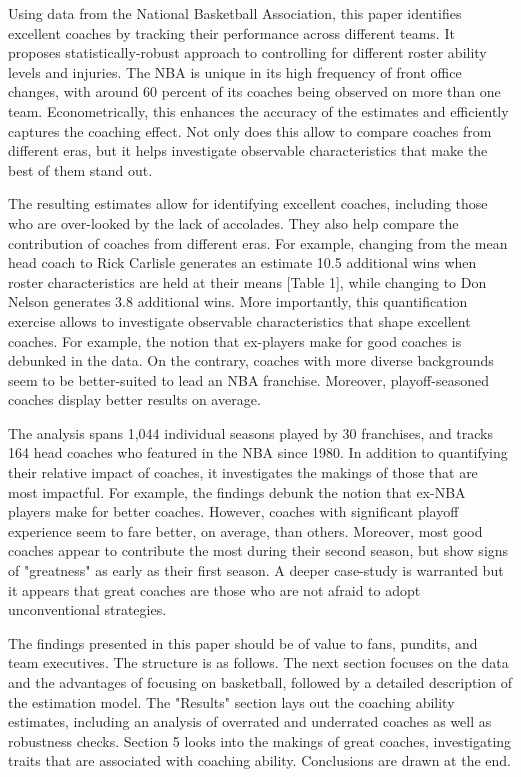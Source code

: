 \documentclass[main.tex]{subfiles}
\begin{document}
Using data from the National Basketball Association, this paper identifies excellent coaches by tracking their performance across different teams. It proposes statistically-robust approach to controlling for different roster ability levels and injuries. The NBA is unique in its high frequency of front office changes, with around 60 percent of its coaches being observed on more than one team. Econometrically, this enhances the accuracy of the estimates and efficiently captures the coaching effect.
Not only does this allow to compare coaches from different eras, but it helps investigate observable characteristics that make the best of them stand out. 

The resulting estimates allow for identifying excellent coaches, including those who are over-looked by the lack of accolades. They also help compare the contribution of coaches from different eras. For example, changing from the mean head coach to Rick Carlisle generates an estimate 10.5 additional wins when roster characteristics are held at their means [Table 1], while changing to Don Nelson generates 3.8 additional wins. More importantly, this quantification exercise allows to investigate observable characteristics that shape excellent coaches. For example, the notion that ex-players make for good coaches is debunked in the data. On the contrary, coaches with more diverse backgrounds seem to be better-suited to lead an NBA franchise. Moreover, playoff-seasoned coaches display better results on average.

The analysis spans 1,044 individual seasons played by 30 franchises, and tracks 164 head coaches who featured in the NBA since 1980. In addition to quantifying their relative impact of coaches, it investigates the makings of those that are most impactful. For example, the findings debunk the notion that ex-NBA players make for better coaches. However, coaches with significant playoff experience seem to fare better, on average, than others. Moreover, most good coaches appear to contribute the most during their second season, but show signs of "greatness" as early as their first season. A deeper case-study is warranted but it appears that great coaches are those who are not afraid to adopt unconventional strategies. 

The findings presented in this paper should be of value to fans, pundits, and team executives. The structure is as follows. The next section focuses on the data and the advantages of focusing on basketball, followed by a detailed description of the estimation model. The "Results" section lays out the coaching ability estimates, including an analysis of overrated and underrated coaches as well as robustness checks. Section 5 looks into the makings of great coaches, investigating traits that are associated with coaching ability. Conclusions are drawn at the end. 


 
\end{document}

